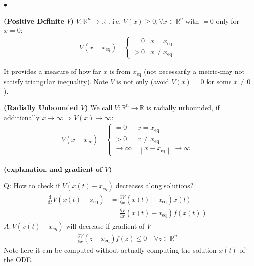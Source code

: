 \documentclass{article}
\newcommand{\bfs}[1]{\textbf{({#1}) }}
\begin{document}
$\bullet$ 
\begin{defa}\bfs{Positive Definite $V$}
 $V: \mathbb{R}^{n} \rightarrow \mathbb{R}$ , i.e. $V(x) \geq 0,  \forall x \in \mathbb{R}^{n}$ with $=0$ only for $x=0$:
\begin{align*}
V\left(x-x_{\mathrm{eq}}\right) \quad \begin{cases}=0 & x=x_{\mathrm{eq}} \\ >0 & x \neq x_{\mathrm{eq}}\end{cases}
\end{align*}
\end{defa}
\begin{rema}
It provides a measure of how far $x$ is from $x_{\mathrm {eq}}$ (not necessarily a metric-may not satisfy triangular inequality). Note $V$ is not only  (avoid $V(x)=0$ for some $x\ne 0$).
\end{rema}
\begin{defa}\bfs{Radially Unbounded $V$}
We call $V: \mathbb{R}^{n} \rightarrow \mathbb{R}$ is radially unbounded, if additionally $x \rightarrow \infty \Rightarrow V(x) \rightarrow \infty$:
\begin{align*}
V\left(x-x_{\mathrm{eq}}\right) \quad \begin{cases}=0 & x=x_{\mathrm{eq}} \\ >0 & x \neq x_{\mathrm{eq}} \\ \rightarrow \infty & \left\|x-x_{\mathrm{eq}}\right\| \rightarrow \infty\end{cases}
\end{align*}
\end{defa}
\begin{rema}\bfs{explanation and gradient of $V$}

Q: How to check if $V\left(x(t)-x_{e q}\right)$ decreases along solutions?
\begin{align*}
\begin{aligned}
\frac{\mathrm{d}}{\mathrm{d} t} V\left(x(t)-x_{\mathrm{eq}}\right) &=\frac{\partial V}{\partial x}\left(x(t)-x_{\mathrm{eq}}\right) \dot{x}(t) \\
&=\frac{\partial V}{\partial x}\left(x(t)-x_{\mathrm{eq}}\right) f(x(t))
\end{aligned}
\end{align*}
$A: V\left(x(t)-x_{e q}\right)$ will decrease if  gradient of $V$
\begin{align*}
\frac{\partial V}{\partial x}\left(z-x_{\mathrm{eq}}\right) f(z) \leq 0 \quad \forall z \in \mathbb{R}^{n}
\end{align*}
Note  here it can be computed without actually computing the solution $x(t)$ of the ODE.
\end{rema}
\end{document}
